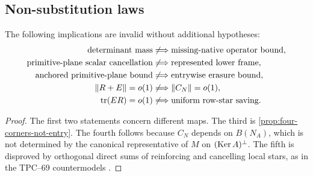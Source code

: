 \subsection{Non-substitution laws}

\begin{corollary}
\label{cor:no-cross-branch-substitution}
The following implications are invalid without additional hypotheses:
\begin{align*}
 \text{determinant mass}
 &\not\Longrightarrow
 \text{missing-native operator bound},\\
 \text{primitive-plane scalar cancellation}
 &\not\Longrightarrow
 \text{represented lower frame},\\
 \text{anchored primitive-plane bound}
 &\not\Longrightarrow
 \text{entrywise erasure bound},\\
 \|R+E\|=o(1)
 &\not\Longrightarrow
 \|C_N\|=o(1),\\
 \operatorname{tr}(ER)=o(1)
 &\not\Longrightarrow
 \text{uniform row-star saving}.
\end{align*}
\end{corollary}

\begin{proof}
The first two statements concern different maps.  The third is
\cref{prop:four-corners-not-entry}.  The fourth follows because
\(C_N\) depends on \(B(N_A)\), which is not determined by the canonical
representative of \(M\) on \((\operatorname{Ker} A)^\perp\).  The fifth is disproved by
orthogonal direct sums of reinforcing and cancelling local stars, as in the
TPC--69 countermodels \citep{WangTPC69}.
\end{proof}
